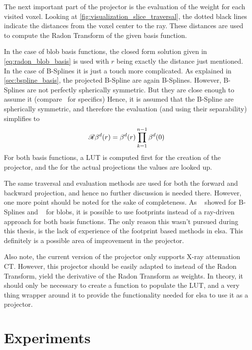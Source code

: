 The next important part of the projector is the evaluation of the weight for each visited voxel.
Looking at \autoref{fig:visualization_slice_traversal}, the dotted black lines indicate the
distances from the voxel center to the ray. These distances are used to compute the Radon Transform
of the given basis function.

In the case of blob basis functions, the closed form solution given in \autoref{eq:radon_blob_basis}
is used with \(r\) being exactly the distance just mentioned. In the case of B-Splines it is just a
touch more complicated. As explained in \autoref{sec:bspline_basis}, the projected B-Spline are
again B-Splines. However, B-Splines are not perfectly spherically symmetric. But they are close
enough to assume it (compare~\cite{momey_b-spline_2012, momey_spline_2015} for specifics) Hence, it
is assumed that the B-Spline are spherically symmetric, and therefore the evaluation (and using
their separability) simplifies to
\[ \mathscr{R}\beta^d(r) = \beta^d(r) \prod^{n - 1}_{k=1} \beta^d(0) \]
For both basis functions, a \gls{LUT} is computed first for the creation of the projector, and the
for the actual projections the values are looked up.

The same traversal and evaluation methods are used for both the forward and backward projection, and
hence no further discussion is needed there. However, one more point should be noted for the sake of
completeness. As \citeauthor*{momey_spline_2015}~\cite{momey_spline_2015} showed for B-Splines and
\citeauthor*{kohler_iterative_2011}~\cite{kohler_iterative_2011} for blobs, it is possible to use
footprints instead of a ray-driven approach for both basis functions. The only reason this wasn't
pursued during this thesis, is the lack of experience of the footprint based methods in elsa. This
definitely is a possible area of improvement in the projector.

Also note, the current version of the projector only supports X-ray attenuation CT. However, this
projector should be easily adapted to instead of the Radon Transform, yield the derivative of the
Radon Transform as weights. In theory, it should only be necessary to create a function to populate
the \gls{LUT}, and a very thing wrapper around it to provide the functionality needed for elsa to
use it as a projector.

\chapter{Experiments}\label{chap:experiments}


